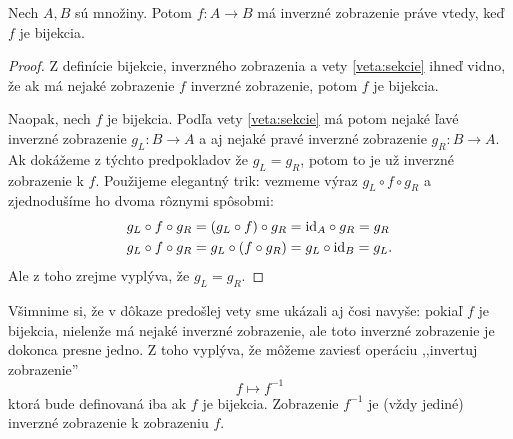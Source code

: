 \begin{veta}\label{veta:bijekciaInverzne}
Nech $A,B$ sú množiny. Potom $f\colon A\to B$ má inverzné zobrazenie práve vtedy, keď $f$ je bijekcia.
\end{veta}
\begin{proof}
Z definície bijekcie, inverzného zobrazenia a vety \ref{veta:sekcie} ihneď vidno, že ak má nejaké zobrazenie 
$f$ inverzné zobrazenie, potom $f$ je bijekcia.

Naopak, nech $f$ je bijekcia. Podľa vety \ref{veta:sekcie} má potom nejaké ľavé inverzné zobrazenie 
$g_L\colon B\to A$ a aj nejaké pravé inverzné zobrazenie $g_R\colon B\to A$. 
Ak dokážeme z týchto predpokladov že $g_L=g_R$, potom to je už inverzné zobrazenie k $f$.
Použijeme elegantný trik: vezmeme výraz $g_L\circ f\circ g_R$ a zjednodušíme ho dvoma
rôznymi spôsobmi:
\begin{align*}
g_L\circ f\circ g_R&=(g_L\circ f)\circ g_R=\mathrm{id}_A\circ g_R=g_R\\
g_L\circ f\circ g_R&=g_L\circ (f\circ g_R)=g_L\circ\mathrm{id}_B=g_L.
\end{align*}
Ale z toho zrejme vyplýva, že $g_L=g_R$.
\end{proof}
Všimnime si, že v dôkaze predošlej vety sme ukázali aj čosi navyše: pokiaľ $f$ je bijekcia, nielenže má
nejaké inverzné zobrazenie, ale toto inverzné zobrazenie je dokonca presne jedno. Z
toho vyplýva, že môžeme
zaviesť operáciu ,,invertuj zobrazenie''
\[
f\mapsto f^{-1}
\]
ktorá bude definovaná iba ak $f$ je bijekcia. Zobrazenie $f^{-1}$ je (vždy jediné) inverzné zobrazenie k zobrazeniu $f$. 

